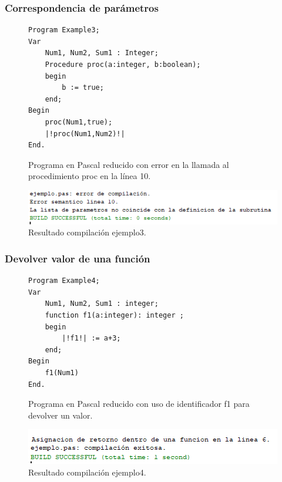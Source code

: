 \subsubsection{Correspondencia de parámetros}
\begin{figure}[H]
\begin{verbatim}
Program Example3;
Var       
    Num1, Num2, Sum1 : Integer;
    Procedure proc(a:integer, b:boolean);
    begin
        b := true;
    end;
Begin
    proc(Num1,true);
    |!proc(Num1,Num2)!|
End.
\end{verbatim}
\caption{Programa en Pascal reducido con error en la llamada al procedimiento proc en la línea 10.}
\label{fig:semantico_ej_error_3}
\end{figure}

\begin{figure}[H]
\centering
\includegraphics[]{img/semantico/semantico_ej3.png}
\caption{Resultado compilación ejemplo3.}
\label{fig:semantico_ej3}
\end{figure}

\subsubsection{Devolver valor de una función}
\begin{figure}[H]
\begin{verbatim}
Program Example4;
Var       
    Num1, Num2, Sum1 : integer;
    function f1(a:integer): integer ;
    begin
        |!f1!| := a+3;
    end;
Begin
    f1(Num1)
End.
\end{verbatim}
\caption{Programa en Pascal reducido con uso de identificador f1 para devolver un valor.}
\label{fig:semantico_ej_error_4}
\end{figure}

\begin{figure}[H]
\centering
\includegraphics[]{img/semantico/semantico_ej4.png}
\caption{Resultado compilación ejemplo4.}
\label{fig:semantico_ej4}
\end{figure}

